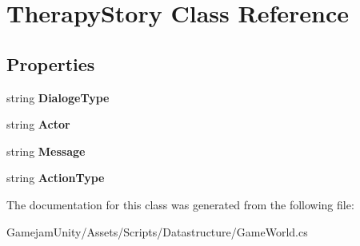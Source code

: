 \hypertarget{class_therapy_story}{}\section{Therapy\+Story Class Reference}
\label{class_therapy_story}
\subsection*{Properties}
\begin{DoxyCompactItemize}
\item 
\mbox{\label{class_therapy_story_a80a4755060f380596ef774273791049e}} 
string {\bfseries Dialoge\+Type}
\item 
\mbox{\label{class_therapy_story_aa8f7ab54623e3a89a4f708a47cdc181b}} 
string {\bfseries Actor}
\item 
\mbox{\label{class_therapy_story_a4301ee229988d83c34be7ed83d189206}} 
string {\bfseries Message}
\item 
\mbox{\label{class_therapy_story_a952b404f07cdc2a6f5562c3ff7852ab0}} 
string {\bfseries Action\+Type}
\end{DoxyCompactItemize}


The documentation for this class was generated from the following file\+:\begin{DoxyCompactItemize}
\item 
Gamejam\+Unity/\+Assets/\+Scripts/\+Datastructure/Game\+World.\+cs\end{DoxyCompactItemize}
